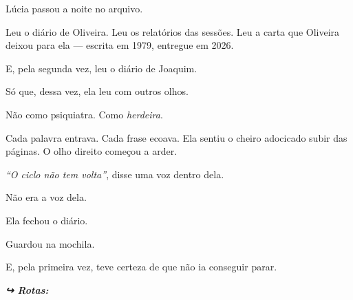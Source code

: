 \noindent Lúcia passou a noite no arquivo.

\noindent Leu o diário de Oliveira. Leu os relatórios das sessões. Leu a carta que Oliveira deixou para ela --- escrita em 1979, entregue em 2026.

\noindent E, pela segunda vez, leu o diário de Joaquim.

\noindent Só que, dessa vez, ela leu com outros olhos.

\noindent Não como psiquiatra.
Como \textit{herdeira}.

\noindent Cada palavra entrava. Cada frase ecoava. Ela sentiu o cheiro adocicado subir das páginas. O olho direito começou a arder.

\noindent \textit{\textquotedblleft{}O ciclo não tem volta\textquotedblright{}}, disse uma voz dentro dela.

\noindent Não era a voz dela.

\noindent Ela fechou o diário.

\noindent Guardou na mochila.

\noindent E, pela primeira vez, teve certeza de que não ia conseguir parar.

\vspace{0.5em}
\noindent\textit{\textbf{↪ Rotas:}  \rotasep {}}